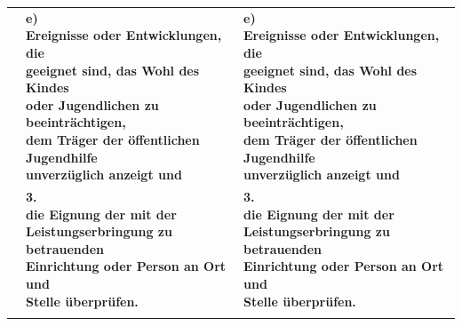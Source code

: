 \documentclass[10pt,a4paper,landscape]{article}
\begin{document}
\begin{longtable}{|L{8.2cm}|L{8.2cm}|L{8.2cm}|}
\hhline{|---|}
 & \textbf{e)   \newline Ereignisse oder Entwicklungen, die  \newline geeignet sind, das Wohl des Kindes  \newline oder Jugendlichen zu beeinträchtigen,  \newline dem Träger der öffentlichen Jugendhilfe  \newline unverzüglich anzeigt und } & \textbf{e)   \newline Ereignisse oder Entwicklungen, die  \newline geeignet sind, das Wohl des Kindes  \newline oder Jugendlichen zu beeinträchtigen,  \newline dem Träger der öffentlichen Jugendhilfe  \newline unverzüglich anzeigt und } \\
\hhline{|---|}
 & \textbf{3.   \newline die Eignung der mit der  \newline Leistungserbringung zu betrauenden  \newline Einrichtung oder Person an Ort und  \newline Stelle überprüfen. } & \textbf{3.   \newline die Eignung der mit der  \newline Leistungserbringung zu betrauenden  \newline Einrichtung oder Person an Ort und  \newline Stelle überprüfen. } \\
\hhline{|---|}

\end{longtable}
\end{document}
